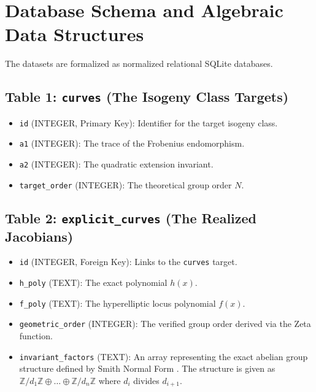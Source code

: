 \documentclass[12pt]{article}
\begin{document}
\section{Database Schema and Algebraic Data Structures}
The datasets are formalized as normalized relational SQLite databases. 

\subsection{Table 1: \texttt{curves} (The Isogeny Class Targets)}
\begin{itemize}
    \item \texttt{id} (INTEGER, Primary Key): Identifier for the target isogeny class.
    \item \texttt{a1} (INTEGER): The trace of the Frobenius endomorphism.
    \item \texttt{a2} (INTEGER): The quadratic extension invariant.
    \item \texttt{target\_order} (INTEGER): The theoretical group order $N$.
\end{itemize}

\subsection{Table 2: \texttt{explicit\_curves} (The Realized Jacobians)}
\begin{itemize}
    \item \texttt{id} (INTEGER, Foreign Key): Links to the \texttt{curves} target.
    \item \texttt{h\_poly} (TEXT): The exact polynomial $h(x)$.
    \item \texttt{f\_poly} (TEXT): The hyperelliptic locus polynomial $f(x)$.
    \item \texttt{geometric\_order} (INTEGER): The verified group order derived via the Zeta function.
    \item \texttt{invariant\_factors} (TEXT): An array representing the exact abelian group structure defined by Smith Normal Form \cite{Smith1861}. The structure is given as $\mathbb{Z}/d_1\mathbb{Z} \oplus \dots \oplus \mathbb{Z}/d_n\mathbb{Z}$ where $d_i$ divides $d_{i+1}$.
\end{itemize}
\end{document}
